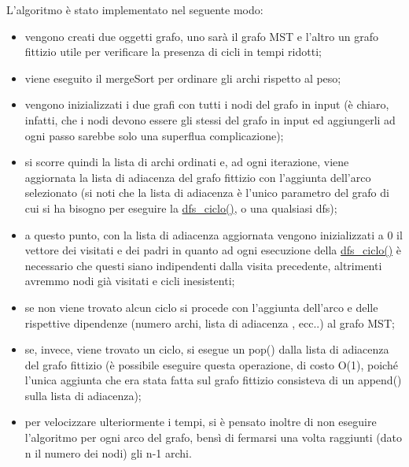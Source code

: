 L'algoritmo è stato implementato nel seguente modo:
\begin{itemize}
    
    \item vengono creati due oggetti grafo, uno sarà il grafo MST e l'altro un grafo fittizio utile per verificare la presenza di cicli in tempi ridotti;
    
    \item viene eseguito il mergeSort per ordinare gli archi rispetto al peso;
    
    \item vengono inizializzati i due grafi con tutti i nodi del grafo in input (è chiaro, infatti, che i nodi devono essere gli stessi del grafo in input ed aggiungerli ad ogni passo sarebbe solo una superflua complicazione);
    
    \item si scorre quindi la lista di archi ordinati e, ad ogni iterazione, viene aggiornata la lista di adiacenza del grafo fittizio con l'aggiunta dell'arco selezionato (si noti che la lista di adiacenza è l'unico parametro del grafo di cui si ha bisogno per eseguire la \hyperlink{dfsciclo}{dfs\_ciclo()}, o una qualsiasi dfs);
    
    \item a questo punto, con la lista di adiacenza aggiornata vengono inizializzati a 0 il vettore dei visitati e dei padri in quanto ad ogni esecuzione della \hyperlink{dfsciclo}{dfs\_ciclo()} è necessario che questi siano indipendenti dalla visita precedente, altrimenti avremmo nodi già visitati e cicli inesistenti;
    
    \item se non viene trovato alcun ciclo si procede con l'aggiunta dell'arco e delle rispettive dipendenze (numero archi, lista di adiacenza , ecc..) al grafo MST;
    
    \item se, invece, viene trovato un ciclo, si esegue un pop() dalla lista di adiacenza del grafo fittizio (è possibile eseguire questa operazione, di costo O(1), poiché l'unica aggiunta che era stata fatta sul grafo fittizio consisteva di un append() sulla lista di adiacenza);
    
    \item per velocizzare ulteriormente i tempi, si è pensato inoltre di non eseguire l'algoritmo per ogni arco del grafo, bensì di fermarsi una volta raggiunti (dato n il numero dei nodi) gli n-1 archi.
    
\end{itemize}
